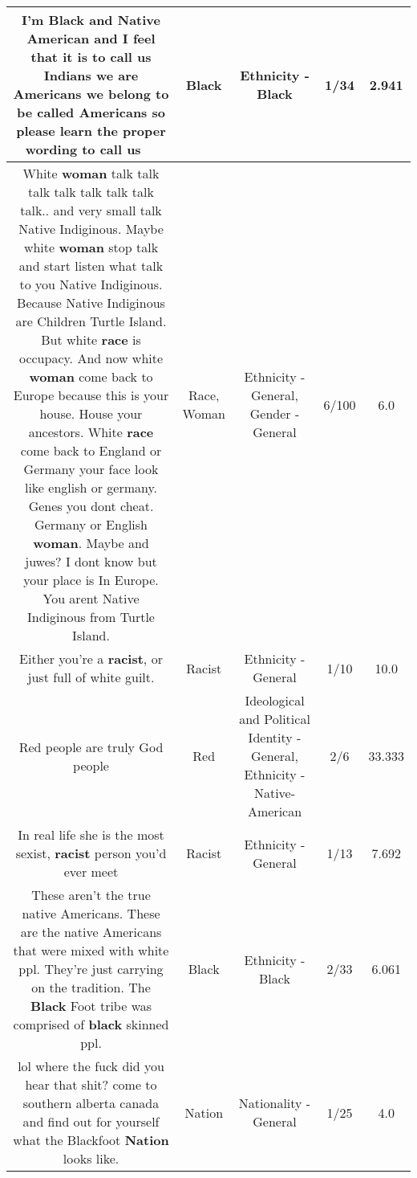 \documentclass[11pt]{article}
\newlength\mylength
\begin{document}
\begin{center}
\begin{longtable}{|C{.65\mylength}|C{.30\mylength}|C{.12\mylength}|C{.12\mylength}|C{.12\mylength}|}
  \small I'm \textbf{Black} and Native American and I feel that it is to call us Indians we are Americans we belong to be called Americans so please learn the proper wording to call us 🤦🏽‍♀️\normalsize   & Black & Ethnicity - Black & 1/34 & 2.941 \\  \hline
  \small White \textbf{woman} talk talk talk talk talk talk talk talk.. and very small talk Native Indiginous. Maybe white \textbf{woman} stop talk and start listen what talk to you Native Indiginous. Because Native Indiginous are Children Turtle Island. But white \textbf{race} is occupacy. And now white \textbf{woman} come back to Europe because this is your house. House your ancestors. White \textbf{race} come back to England or Germany your face look like english or germany. Genes you dont cheat. Germany or English \textbf{woman}. Maybe and juwes? I dont know but your place is In Europe. You arent Native Indiginous from Turtle Island.\normalsize   & Race, Woman & Ethnicity - General, Gender - General & 6/100 & 6.0 \\  \hline
  \small Either you're a \textbf{racist}, or just full of white guilt.\normalsize   & Racist & Ethnicity - General & 1/10 & 10.0 \\  \hline
  \small Red people are truly God people\normalsize   & Red &  Ideological and Political Identity - General, Ethnicity - Native-American & 2/6 & 33.333 \\  \hline
  \small In real life she is the most sexist, \textbf{racist} person you'd ever meet\normalsize   & Racist & Ethnicity - General & 1/13 & 7.692 \\  \hline
  \small These aren't the true native Americans. These are the native Americans that were mixed with white ppl. They're just carrying on the tradition. The \textbf{Black} Foot tribe was comprised of \textbf{black} skinned ppl.\normalsize   & Black & Ethnicity - Black & 2/33 & 6.061 \\  \hline
  \small lol where the fuck did you hear that shit? come to southern alberta canada and find out for yourself what the Blackfoot \textbf{Nation} looks like.\normalsize   & Nation & Nationality - General & 1/25 & 4.0 \\  \hline

\end{longtable}
\end{center}
\end{document}
